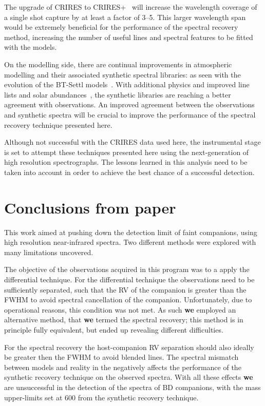 The upgrade of CRIRES to CRIRES+~\citep{dorn_crires_2016} will increase the wavelength coverage of a single shot capture by at least a factor of 3--5.
This larger wavelength span would be extremely beneficial for the \textchisquared{} performance of the spectral recovery method, increasing the number of useful lines and spectral features to be fitted with the models.

On the modelling side, there are continual improvements in atmospheric modelling and their associated synthetic spectral libraries: as seen with the evolution of the {BT-Settl} models~\citep{allard_btsettl_2013}.
With additional physics and improved line lists and solar abundances~\citep [e.g.][]{asplund_chemical_2009,caffau_solar_2011}, the synthetic libraries are reaching a better agreement with \nir{} observations.
An improved agreement between the \nir{} observations and synthetic spectra will be crucial to improve the performance of the spectral recovery technique presented here.

Although not successful with the CRIRES data used here, the instrumental stage is set to attempt these techniques presented here using the next-generation of high resolution spectrographs.
The lessons learned in this analysis need to be taken into account in order to achieve the best chance of a successful detection.


\section{Conclusions from paper}
\label{sec:conclusionsfrom paper}
This work aimed at pushing down the detection limit of faint companions, using high resolution near-infrared spectra.
Two different methods were explored with many limitations uncovered.

The objective of the observations acquired in this program was to a apply the differential technique.
For the differential technique the observations need to be sufficiently separated, such that the {RV} of the companion is greater than the {FWHM} to avoid spectral cancellation of the companion.
Unfortunately, due to operational reasons, this condition was not met.
As such \textbf{we} employed an alternative method, that \textbf{we} termed the spectral recovery; this method is in principle fully equivalent, but ended up revealing different difficulties.

For the spectral recovery the host-companion {RV} separation should also ideally be greater then the {FWHM} to avoid blended lines.
The spectral mismatch between models and reality in the \nir{} negatively affects the performance of the synthetic recovery technique on the observed spectra.
With all these effects \textbf{we} are unsuccessful in the detection of the \nir{} spectra of {BD} companions,  with the mass upper-limits set at 600\Mjup{} from the synthetic recovery technique.


